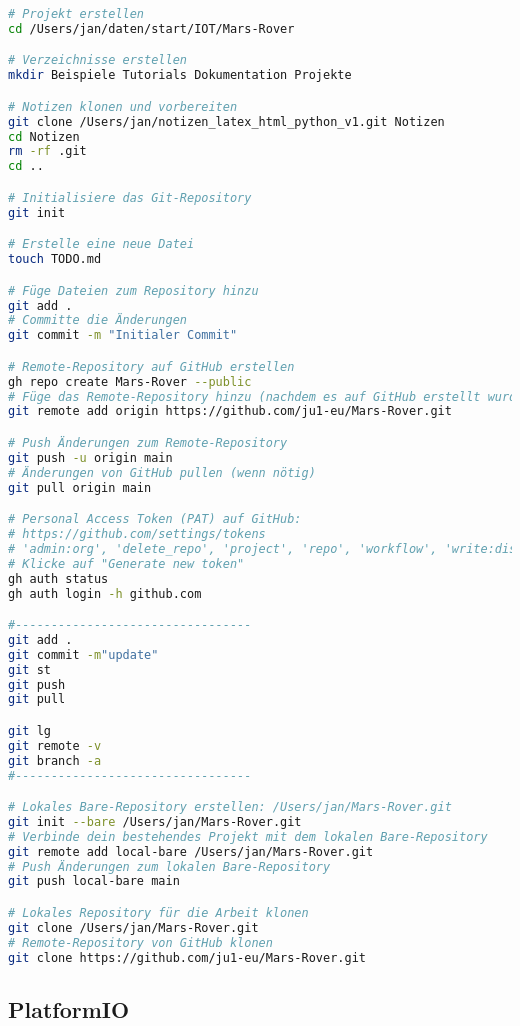 \documentclass{vorlage-design-main}
\begin{document}
\begin{lstlisting}[language=bash]
# Projekt erstellen
cd /Users/jan/daten/start/IOT/Mars-Rover

# Verzeichnisse erstellen
mkdir Beispiele Tutorials Dokumentation Projekte

# Notizen klonen und vorbereiten
git clone /Users/jan/notizen_latex_html_python_v1.git Notizen
cd Notizen
rm -rf .git
cd ..

# Initialisiere das Git-Repository
git init

# Erstelle eine neue Datei
touch TODO.md

# Füge Dateien zum Repository hinzu
git add .
# Committe die Änderungen
git commit -m "Initialer Commit"

# Remote-Repository auf GitHub erstellen
gh repo create Mars-Rover --public
# Füge das Remote-Repository hinzu (nachdem es auf GitHub erstellt wurde)
git remote add origin https://github.com/ju1-eu/Mars-Rover.git

# Push Änderungen zum Remote-Repository
git push -u origin main
# Änderungen von GitHub pullen (wenn nötig)
git pull origin main

# Personal Access Token (PAT) auf GitHub:
# https://github.com/settings/tokens
# 'admin:org', 'delete_repo', 'project', 'repo', 'workflow', 'write:discussion'
# Klicke auf "Generate new token"
gh auth status
gh auth login -h github.com

#---------------------------------
git add .
git commit -m"update"
git st
git push
git pull

git lg
git remote -v
git branch -a
#---------------------------------

# Lokales Bare-Repository erstellen: /Users/jan/Mars-Rover.git
git init --bare /Users/jan/Mars-Rover.git
# Verbinde dein bestehendes Projekt mit dem lokalen Bare-Repository
git remote add local-bare /Users/jan/Mars-Rover.git
# Push Änderungen zum lokalen Bare-Repository
git push local-bare main

# Lokales Repository für die Arbeit klonen
git clone /Users/jan/Mars-Rover.git
# Remote-Repository von GitHub klonen
git clone https://github.com/ju1-eu/Mars-Rover.git
\end{lstlisting}

\hypertarget{platformio}{%
\subsection{PlatformIO}\label{platformio}}
\end{document}

